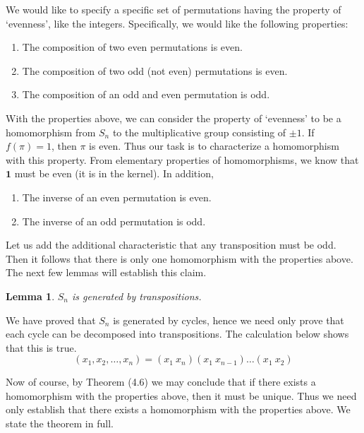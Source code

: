\documentclass[12pt]{amsbook}
\makeatletter
\theoremstyle{plain}
\newtheorem{lemma}[theorem]{Lemma}
\theoremstyle{definition}
\renewenvironment{proof}[1][\proofname]{\par
  \pushQED{\qed}%
  \normalfont \topsep6\p@\@plus6\p@\relax
  \list{}{\leftmargin=0em
          \rightmargin=\leftmargin
          \settowidth{\itemindent}{\itshape#1}%
          \labelwidth=\itemindent}

  \item[\hskip\labelsep
        \itshape
    #1\@addpunct{.}]\ignorespaces
}{%
  \popQED\endlist\@endpefalse
}
\makeatother
\begin{document}
We would like to specify a specific set of permutations having the property of `evenness', like the integers. Specifically, we would like the following properties:
%
\begin{enumerate}
    \item The composition of two even permutations is even.
    \item The composition of two odd (not even) permutations is even.
    \item The composition of an odd and even permutation is odd.
\end{enumerate}
%
With the properties above, we can consider the property of `evenness' to be a homomorphism from $S_n$ to the multiplicative group consisting of $\pm 1$. If $f(\pi) = 1$, then $\pi$ is even. Thus our task is to characterize a homomorphism with this property. From elementary properties of homomorphisms, we know that $\mathbf{1}$ must be even (it is in the kernel). In addition,
%
\begin{enumerate}
    \item The inverse of an even permutation is even.
    \item The inverse of an odd permutation is odd.
\end{enumerate}
%
Let us add the additional characteristic that any transposition must be odd. Then it follows that there is only one homomorphism with the properties above. The next few lemmas will establish this claim.

\begin{lemma}
    $S_n$ is generated by transpositions.
\end{lemma}
\begin{proof}
    We have proved that $S_n$ is generated by cycles, hence we need only prove that each cycle can be decomposed into transpositions. The calculation below shows that this is true.
    \[ (x_1, x_2, \dots, x_n) = (x_1\ x_n) (x_1\ x_{n-1}) \dots (x_1\ x_2) \]
\end{proof}

Now of course, by Theorem (4.6) we may conclude that if there exists a homomorphism with the properties above, then it must be unique. Thus we need only establish that there exists a homomorphism with the properties above. We state the theorem in full.
\end{document}
